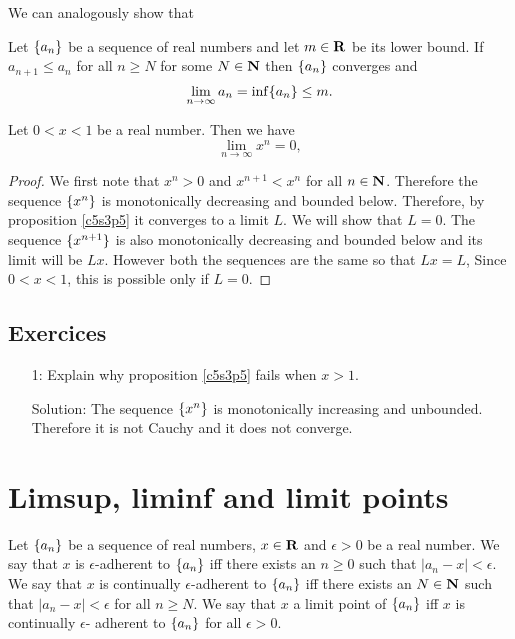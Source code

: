 We can analogously show that
\begin{prop}\label{c5s3p4}
Let $\{a_n\}$ be a sequence of real numbers and let $m \in \mathbf{R}$ be its
lower bound. If $a_{n+1} \le a_n$ for all $n \ge N$ for some $N \in \mathbf{N}$
then $\{a_n\}$ converges and
\[
\lim_{n \rightarrow \infty}a_n = \inf\{a_n\} \le m.
\]
\end{prop}

\begin{prop}\label{c5s3p5}
Let $0 < x < 1$ be a real number. Then we have
\[
\lim_{n \rightarrow \infty}x^n = 0,
\]
\end{prop}
\begin{proof}
We first note that $x^n > 0$ and $x^{n+1} < x^n$ for all $n \in \mathbf{N}$. 
Therefore the sequence $\{x^n\}$ is monotonically decreasing and bounded
below. Therefore, by proposition \ref{c5s3p5} it converges to a limit $L$.
We will show that $L = 0$. The sequence $\{x^{n+1}\}$ is also monotonically
decreasing and bounded below and its limit will be $Lx$. However both the
sequences are the same so that $Lx = L$, Since $0 < x < 1$, this is possible
only if $L = 0$.
\end{proof}

\subsection{Exercices}
\begin{enumerate}
\item[1:] Explain why proposition \ref{c5s3p5} fails when $x > 1$.
\item[Solution:] The sequence $\{x^n\}$ is monotonically increasing and
unbounded. Therefore it is not Cauchy and it does not converge.
\end{enumerate}

\section{Limsup, liminf and limit points}\label{c5s4}
\begin{defn}\label{c5s4d1}
Let $\{a_n\}$ be a sequence of real numbers, $x \in \mathbf{R}$ and $\epsilon
> 0$ be a real number. We say that $x$ is $\epsilon$-adherent to $\{a_n\}$
iff there exists an $n \ge 0$ such that $|a_n - x| < \epsilon$. We say
that $x$ is continually $\epsilon$-adherent to $\{a_n\}$ iff there exists
an $N \in \mathbf{N}$ such that $|a_n - x| < \epsilon$ for all $n \ge N$. We say
that $x$ a limit point of $\{a_n\}$ iff $x$ is continually $\epsilon$-
adherent to $\{a_n\}$ for all $\epsilon > 0$.
\end{defn}

